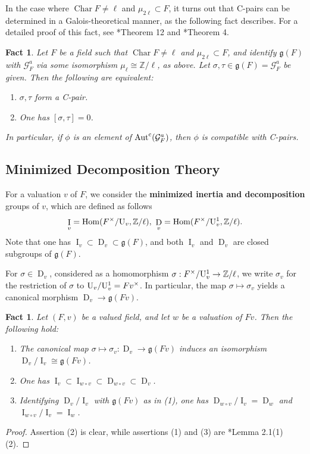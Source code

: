\documentclass[11pt]{amsart}
\newtheorem{fact}[proposition]{Fact}
\theoremstyle{definition}
\theoremstyle{remark}
\numberwithin{equation}{section}
\DeclareMathOperator{\Aut}{Aut}
\DeclareMathOperator{\Char}{Char}
\DeclareMathOperator{\D}{D}
\DeclareMathOperator{\I}{I}
\DeclareMathOperator{\Hom}{Hom}
\newcommand{\Z}{\mathbb{Z}}
\newcommand{\U}{{\rm U}}
\newcommand{\Gc}{\mathcal{G}}
\newcommand{\gfrak}{\mathfrak{g}}
\newcommand{\Autc}{\Aut^{\rm c}}
\begin{document}
In the case where $\Char F \neq \ell$ and $\mu_{2\ell} \subset F$, it turns out that C-pairs can be determined in a Galois-theoretical manner, as the following fact describes.
For a detailed proof of this fact, see \cite{Topaz:2013a}*{Theorem 12} and \cite{Topaz:2015b}*{Theorem 4}.

\begin{fact}
\label{fact: localthy / c-pairs / c-vs-cl}
  Let $F$ be a field such that $\Char F \neq \ell$ and $\mu_{2\ell} \subset F$, and identify $\gfrak(F)$ with $\Gc_F^a$ via some isomorphism $\mu_\ell \cong \Z/\ell$, as above.
  Let $\sigma,\tau \in \gfrak(F) = \Gc_F^a$ be given.
  Then the following are equivalent:
  \begin{enumerate}
    \item $\sigma,\tau$ form a C-pair.
    \item One has $[\sigma,\tau] = 0$.
  \end{enumerate}
  In particular, if $\phi$ is an element of $\Autc(\Gc_F^a)$, then $\phi$ is compatible with C-pairs.
\end{fact}

\subsection{Minimized Decomposition Theory}
\label{subsection: localthy / mindec}

For a valuation $v$ of $F$, we consider the {\bf minimized inertia and decomposition} groups of $v$, which are defined as follows
\[ \I_v = \Hom(F^\times/\U_v,\Z/\ell), \ \D_v = \Hom(F^\times/\U_v^1,\Z/\ell). \]
Note that one has $\I_v \subset \D_v \subset \gfrak(F)$, and both $\I_v$ and $\D_v$ are closed subgroups of $\gfrak(F)$.

For $\sigma \in \D_v$, considered as a homomorphism $\sigma : F^\times/\U_v^1 \rightarrow \Z/\ell$, we write $\sigma_v$ for the restriction of $\sigma$ to $\U_v/\U_v^1 = Fv^\times$.
In particular, the map $\sigma \mapsto \sigma_v$ yields a canonical morphism $\D_v \rightarrow \gfrak(Fv)$.

\begin{fact}
\label{fact: localthy / mindec / mindec}
  Let $(F,v)$ be a valued field, and let $w$ be a valuation of $Fv$.
  Then the following hold:
  \begin{enumerate}
    \item The canonical map $\sigma \mapsto \sigma_v : \D_v \rightarrow \gfrak(Fv)$ induces an isomorphism $\D_v/\I_v \cong \gfrak(Fv)$.
    \item One has $\I_v \subset \I_{w \circ v} \subset \D_{w \circ v} \subset \D_v$.
    \item Identifying $\D_v/\I_v$ with $\gfrak(Fv)$ as in (1), one has $\D_{w \circ v}/\I_v = \D_w$ and $\I_{w \circ v}/\I_v = \I_w$.
  \end{enumerate}
\end{fact}
\begin{proof}
  Assertion (2) is clear, while assertions (1) and (3) are \cite{Topaz:2015}*{Lemma 2.1(1)(2)}.
\end{proof}
\end{document}
